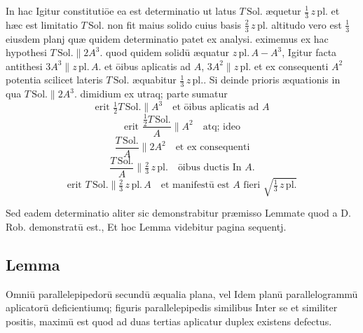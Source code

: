 \documentclass[11pt,a4paper]{article}
\begin{document}
In hac Igitur constitutiōe ea est determinatio ut latus $T\,\mathrm{Sol.}$ æquetur  $\tfrac{1}{3}\,z\,\mathrm{pl.}$ et hæc est limitatio  $T\,\mathrm{Sol.}$ non fit maius solido cuius basis $\tfrac{2}{3}\,z\,\mathrm{pl.}$ altitudo vero est $\tfrac{1}{3}$ eiusdem planj quæ quidem determinatio patet ex analysi. eximemus ex hac hypothesi $T\,\mathrm{Sol.} \parallel 2A^{3}$. quod quidem solidū æquatur $z\,\mathrm{pl.}\,A - A^{3}$, Igitur facta antithesi $3A^{3} \parallel z\,\mathrm{pl.}\,A$. et ōibus aplicatis ad $A$, $3A^{2} \parallel z\,\mathrm{pl.}$ et ex consequenti $A^{2}$ potentia scilicet lateris $T\,\mathrm{Sol.}$ æquabitur $\tfrac{1}{3}\,z\,\mathrm{pl.}$. Si deinde prioris æquationis in qua $T\,\mathrm{Sol.} \parallel 2A^{3}$. dimidium ex utraq; parte sumatur 
\[ \text{erit } \tfrac{1}{2}T\,\mathrm{Sol.} \parallel A^{3} \quad \text{et ōibus aplicatis ad } A \]
\[ \text{erit } \frac{\tfrac{1}{2}T\,\mathrm{Sol.}}{A} \parallel A^{2} \quad \text{atq; ideo} \]
\[ \frac{T\,\mathrm{Sol.}}{A} \parallel 2A^{2} \quad \text{et ex consequenti} \]
\[ \frac{T\,\mathrm{Sol.}}{A} \parallel \tfrac{2}{3}\,z\,\mathrm{pl.} \quad \text{ōibus ductis In } A. \]
\[ \text{erit } T\,\mathrm{Sol.} \parallel \tfrac{2}{3}\,z\,\mathrm{pl.}\,A \quad \text{et manifestū est } A \text{ fieri } \sqrt{\tfrac{1}{3}\,z\,\mathrm{pl.}} \]

Sed eadem determinatio aliter sic demonstrabitur præmisso Lemmate quod a D. Rob. demonstratū est., Et hoc Lemma videbitur pagina sequentj.


\subsection*{Lemma}

Omniū parallelepipedorū secundū æqualia plana, vel Idem planū parallelogrammū aplicatorū deficientiumq; figuris parallelepipedis similibus Inter se et similiter positis, maximū est quod ad duas tertias aplicatur duplex existens defectus.
\end{document}
